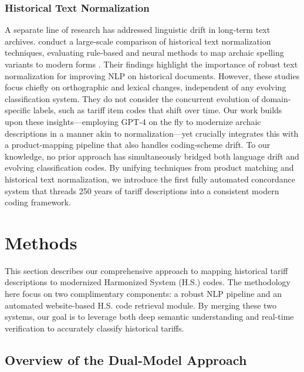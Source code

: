 \documentclass[12pt]{article}
\begin{document}
\subsubsection*{Historical Text Normalization}  
A separate line of research has addressed linguistic drift in long‐term text archives. \citeauthor{bollmann19} conduct a large‐scale comparison of historical text normalization techniques, evaluating rule‐based and neural methods to map archaic spelling variants to modern forms \cite{bollmann19}. Their findings highlight the importance of robust text normalization for improving NLP on historical documents. However, these studies focus chiefly on orthographic and lexical changes, independent of any evolving classification system. They do not consider the concurrent evolution of domain‐specific labels, such as tariff item codes that shift over time. Our work builds upon these insights—employing GPT‐4 on the fly to modernize archaic descriptions in a manner akin to normalization—yet crucially integrates this with a product‐mapping pipeline that also handles coding‐scheme drift. To our knowledge, no prior approach has simultaneously bridged both language drift and evolving classification codes. By unifying techniques from product matching and historical text normalization, we introduce the first fully automated concordance system that threads 250 years of tariff descriptions into a consistent modern coding framework.










\newpage


\section{Methods}
This section describes our comprehensive approach to mapping historical tariff descriptions to modernized Harmonized System (H.S.) codes. The methodology here focus on two complimentary components: a robust NLP pipeline and an automated website-based H.S. code retrieval module. By merging these two systems, our goal is to leverage both deep semantic understanding and real-time verification to accurately classify historical tariffs. 

\subsection{Overview of the Dual-Model Approach}
\end{document}
